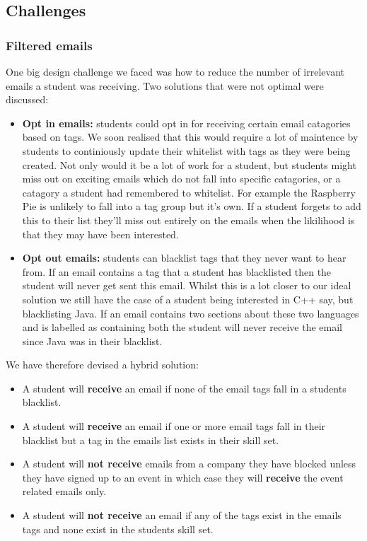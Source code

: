 \subsection{Challenges}
  \subsubsection{Filtered emails}
    One big design challenge we faced was how to reduce the number of irrelevant emails a student was receiving. Two solutions that were not optimal were discussed:
    \begin{itemize}
      \item \textbf{Opt in emails:} students could opt in for receiving certain email catagories based on tags. We soon realised that this would require a lot of maintence by students to continiously update their whitelist with tags as they were being created.
      Not only would it be a lot of work for a student, but students might miss out on exciting emails which do not fall into specific catagories, or a catagory a student had remembered to whitelist. For example the Raspberry Pie is unlikely to fall into a tag group but it's own. If a student forgets to add this to their list they'll miss out entirely on the emails when the likilihood is that they may have been interested.
      \item \textbf{Opt out emails:} students can blacklist tags that they never want to hear from. If an email contains a tag that a student has blacklisted then the student will never get sent this email. Whilst this is a lot closer to our ideal solution we still have the case of a student being interested in C++ say, but blacklisting Java. If an email contains two sections about these two languages and is labelled as containing both the student will never receive the email since Java was in their blacklist.
    \end{itemize}

    We have therefore devised a hybrid solution:
    \begin{itemize}
      \item A student will \textbf{receive} an email if none of the email tags fall in a students blacklist.
      \item A student will \textbf{receive} an email if one or more email tags fall in their blacklist but a tag in the emails list exists in their skill set.
      \item A student will \textbf{not receive} emails from a company they have blocked unless they have signed up to an event in which case they will \textbf{receive} the event related emails only.
      \item A student will \textbf{not receive} an email if any of the tags exist in the emails tags and none exist in the students skill set.
    \end{itemize}

